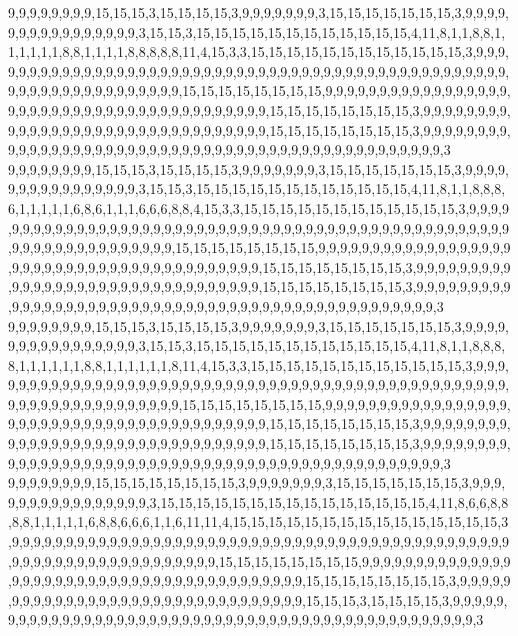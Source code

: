 9,9,9,9,9,9,9,9,15,15,15,3,15,15,15,15,3,9,9,9,9,9,9,9,3,15,15,15,15,15,15,15,3,9,9,9,9,9,9,9,9,9,9,9,9,9,9,9,9,3,15,15,3,15,15,15,15,15,15,15,15,15,15,15,15,4,11,8,1,1,8,8,1,1,1,1,1,1,8,8,1,1,1,1,8,8,8,8,8,11,4,15,3,3,15,15,15,15,15,15,15,15,15,15,15,15,3,9,9,9,9,9,9,9,9,9,9,9,9,9,9,9,9,9,9,9,9,9,9,9,9,9,9,9,9,9,9,9,9,9,9,9,9,9,9,9,9,9,9,9,9,9,9,9,9,9,9,9,9,9,9,9,9,9,9,9,9,9,9,9,9,9,15,15,15,15,15,15,15,15,9,9,9,9,9,9,9,9,9,9,9,9,9,9,9,9,9,9,9,9,9,9,9,9,9,9,9,9,9,9,9,9,9,9,9,9,9,9,9,9,9,15,15,15,15,15,15,15,15,3,9,9,9,9,9,9,9,9,9,9,9,9,9,9,9,9,9,9,9,9,9,9,9,9,9,9,9,9,9,9,9,9,15,15,15,15,15,15,15,15,3,9,9,9,9,9,9,9,9,9,9,9,9,9,9,9,9,9,9,9,9,9,9,9,9,9,9,9,9,9,9,9,9,9,9,9,9,9,9,9,9,9,9,9,9,9,9,9,9,3
9,9,9,9,9,9,9,9,15,15,15,3,15,15,15,15,3,9,9,9,9,9,9,9,3,15,15,15,15,15,15,15,3,9,9,9,9,9,9,9,9,9,9,9,9,9,9,9,9,3,15,15,3,15,15,15,15,15,15,15,15,15,15,15,15,4,11,8,1,1,8,8,8,6,1,1,1,1,1,6,8,6,1,1,1,6,6,6,8,8,4,15,3,3,15,15,15,15,15,15,15,15,15,15,15,15,3,9,9,9,9,9,9,9,9,9,9,9,9,9,9,9,9,9,9,9,9,9,9,9,9,9,9,9,9,9,9,9,9,9,9,9,9,9,9,9,9,9,9,9,9,9,9,9,9,9,9,9,9,9,9,9,9,9,9,9,9,9,9,9,9,9,15,15,15,15,15,15,15,15,9,9,9,9,9,9,9,9,9,9,9,9,9,9,9,9,9,9,9,9,9,9,9,9,9,9,9,9,9,9,9,9,9,9,9,9,9,9,9,9,9,15,15,15,15,15,15,15,15,3,9,9,9,9,9,9,9,9,9,9,9,9,9,9,9,9,9,9,9,9,9,9,9,9,9,9,9,9,9,9,9,9,15,15,15,15,15,15,15,15,3,9,9,9,9,9,9,9,9,9,9,9,9,9,9,9,9,9,9,9,9,9,9,9,9,9,9,9,9,9,9,9,9,9,9,9,9,9,9,9,9,9,9,9,9,9,9,9,9,3
9,9,9,9,9,9,9,9,15,15,15,3,15,15,15,15,3,9,9,9,9,9,9,9,3,15,15,15,15,15,15,15,3,9,9,9,9,9,9,9,9,9,9,9,9,9,9,9,9,3,15,15,3,15,15,15,15,15,15,15,15,15,15,15,15,4,11,8,1,1,8,8,8,8,1,1,1,1,1,1,8,8,1,1,1,1,1,1,8,11,4,15,3,3,15,15,15,15,15,15,15,15,15,15,15,15,3,9,9,9,9,9,9,9,9,9,9,9,9,9,9,9,9,9,9,9,9,9,9,9,9,9,9,9,9,9,9,9,9,9,9,9,9,9,9,9,9,9,9,9,9,9,9,9,9,9,9,9,9,9,9,9,9,9,9,9,9,9,9,9,9,9,15,15,15,15,15,15,15,15,9,9,9,9,9,9,9,9,9,9,9,9,9,9,9,9,9,9,9,9,9,9,9,9,9,9,9,9,9,9,9,9,9,9,9,9,9,9,9,9,9,15,15,15,15,15,15,15,15,3,9,9,9,9,9,9,9,9,9,9,9,9,9,9,9,9,9,9,9,9,9,9,9,9,9,9,9,9,9,9,9,9,15,15,15,15,15,15,15,15,3,9,9,9,9,9,9,9,9,9,9,9,9,9,9,9,9,9,9,9,9,9,9,9,9,9,9,9,9,9,9,9,9,9,9,9,9,9,9,9,9,9,9,9,9,9,9,9,9,3
9,9,9,9,9,9,9,9,15,15,15,15,15,15,15,15,3,9,9,9,9,9,9,9,3,15,15,15,15,15,15,15,3,9,9,9,9,9,9,9,9,9,9,9,9,9,9,9,9,3,15,15,15,15,15,15,15,15,15,15,15,15,15,15,15,4,11,8,6,6,8,8,8,8,1,1,1,1,1,6,8,8,6,6,6,1,1,6,11,11,4,15,15,15,15,15,15,15,15,15,15,15,15,15,15,15,3,9,9,9,9,9,9,9,9,9,9,9,9,9,9,9,9,9,9,9,9,9,9,9,9,9,9,9,9,9,9,9,9,9,9,9,9,9,9,9,9,9,9,9,9,9,9,9,9,9,9,9,9,9,9,9,9,9,9,9,9,9,9,9,9,9,15,15,15,15,15,15,15,15,9,9,9,9,9,9,9,9,9,9,9,9,9,9,9,9,9,9,9,9,9,9,9,9,9,9,9,9,9,9,9,9,9,9,9,9,9,9,9,9,9,15,15,15,15,15,15,15,15,3,9,9,9,9,9,9,9,9,9,9,9,9,9,9,9,9,9,9,9,9,9,9,9,9,9,9,9,9,9,9,9,9,15,15,15,3,15,15,15,15,3,9,9,9,9,9,9,9,9,9,9,9,9,9,9,9,9,9,9,9,9,9,9,9,9,9,9,9,9,9,9,9,9,9,9,9,9,9,9,9,9,9,9,9,9,9,9,9,9,3
